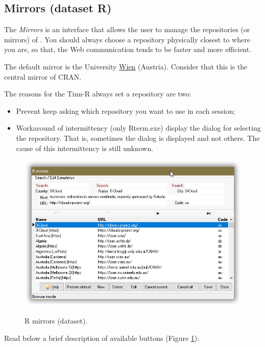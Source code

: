\subsection{Mirrors (dataset R)}

The \textit{Mirrors} is an interface that allows the user to manage the repositories (or mirrors) of \RR{}.
You should always choose a repository physically closest to where you are,
so that, the Web communication tends to be faster and more efficient.

The default mirror is the University \href{http://cran.at.r-project.org/}{Wien}
(Austria). Consider that this is the central mirror of CRAN.

The reasons for the Tinn-R always set a repository are two:
\begin {itemize}
   \item Prevent \RR{} keep asking which repository you want to use in each session;
   \item Workaround of intermittency (only Rterm.exe) display the dialog for selecting the repository.
    That is, sometimes the dialog is displayed and not others. The cause of this intermittency is still unknown.
\end {itemize}

\begin{figure}[H]
  \includegraphics[scale=0.35]{./res/dlg_mirrors.png}\\
  \caption{R mirrors (dataset).}
  \label{fig:dlg_mirrors}
\end{figure}

Read below a brief description of available buttons (Figure \ref{fig:dlg_mirrors}):

